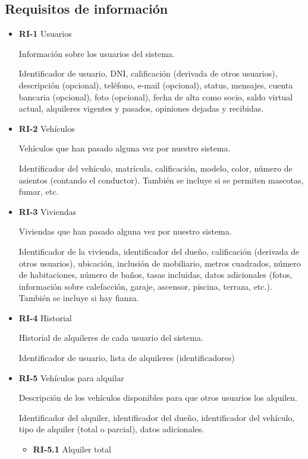 \documentclass[11pt,spanish]{article} %
\begin{document}
\subsection{Requisitos de información}
\begin{itemize}
	\item \textbf{RI-1} Usuarios
	
	Información sobre los usuarios del sistema.
	
	Identificador de usuario, DNI, calificación (derivada de otros usuarios), descripción (opcional), teléfono, e-mail (opcional), status, mensajes, cuenta bancaria (opcional), foto (opcional), fecha de alta como socio, saldo virtual actual, alquileres vigentes y pasados, opiniones dejadas y recibidas.
	
	\item \textbf{RI-2} Vehículos
	
	Vehículos que han pasado alguna vez por nuestro sistema.
	
	Identificador del vehículo, matrícula, calificación, modelo, color, número de asientos (contando el conductor).
	También se incluye si se permiten mascotas, fumar, etc.
	
	\item \textbf{RI-3} Viviendas
	
	Viviendas que han pasado alguna vez por nuestro sistema.
	
	Identificador de la vivienda, identificador del dueño, calificación (derivada de otros usuarios), ubicación, inclusión de mobiliario, metros cuadrados, número de habitaciones, número de baños, tasas incluidas, datos adicionales (fotos, información sobre calefacción, garaje, ascensor, piscina, terraza, etc.).
	También se incluye si hay fianza.
	
	\item \textbf{RI-4} Historial
	
	Historial de alquileres de cada usuario del sistema.
	
	Identificador de usuario, lista de alquileres (identificadores)
		
	\item \textbf{RI-5} Vehículos para alquilar
	
	Descripción de los vehículos disponibles para que otros usuarios los alquilen.
	
	Identificador del alquiler, identificador del dueño, identificador del vehículo, tipo de alquiler (total o parcial), datos adicionales.
	\begin{itemize}
		\item \textbf{RI-5.1} Alquiler total
		

\end{itemize}
\end{itemize}
\end{document}
